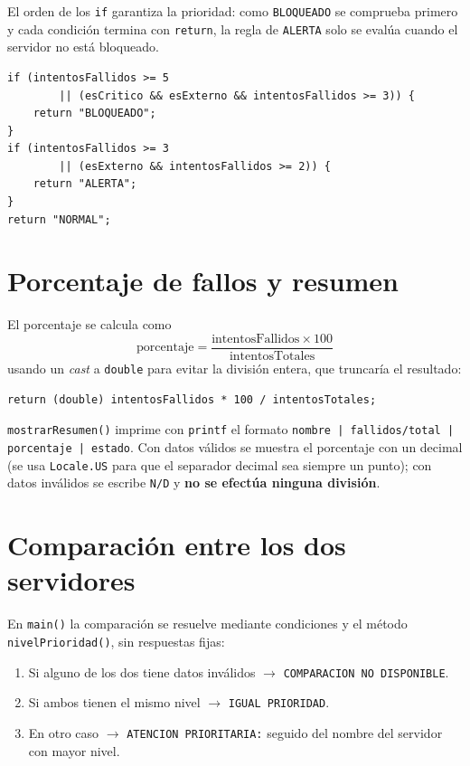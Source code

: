 \documentclass[11pt,a4paper]{article}
\begin{document}
El orden de los \texttt{if} garantiza la prioridad: como \texttt{BLOQUEADO} se
comprueba primero y cada condición termina con \texttt{return}, la regla de
\texttt{ALERTA} solo se evalúa cuando el servidor no está bloqueado.

\begin{lstlisting}
if (intentosFallidos >= 5
        || (esCritico && esExterno && intentosFallidos >= 3)) {
    return "BLOQUEADO";
}
if (intentosFallidos >= 3
        || (esExterno && intentosFallidos >= 2)) {
    return "ALERTA";
}
return "NORMAL";
\end{lstlisting}

\section{Porcentaje de fallos y resumen}
El porcentaje se calcula como
\[
  \text{porcentaje} = \frac{\text{intentosFallidos} \times 100}{\text{intentosTotales}}
\]
usando un \textit{cast} a \texttt{double} para evitar la división entera, que
truncaría el resultado:

\begin{lstlisting}
return (double) intentosFallidos * 100 / intentosTotales;
\end{lstlisting}

\texttt{mostrarResumen()} imprime con \texttt{printf} el formato
\texttt{nombre | fallidos/total | porcentaje | estado}. Con datos válidos se
muestra el porcentaje con un decimal (se usa \texttt{Locale.US} para que el
separador decimal sea siempre un punto); con datos inválidos se escribe
\texttt{N/D} y \textbf{no se efectúa ninguna división}.


\section{Comparación entre los dos servidores}
En \texttt{main()} la comparación se resuelve mediante condiciones y el método
\texttt{nivelPrioridad()}, sin respuestas fijas:

\begin{enumerate}[nosep]
  \item Si alguno de los dos tiene datos inválidos $\rightarrow$ \texttt{COMPARACION NO DISPONIBLE}.
  \item Si ambos tienen el mismo nivel $\rightarrow$ \texttt{IGUAL PRIORIDAD}.
  \item En otro caso $\rightarrow$ \texttt{ATENCION PRIORITARIA:} seguido del nombre del servidor con mayor nivel.
\end{enumerate}
\end{document}
